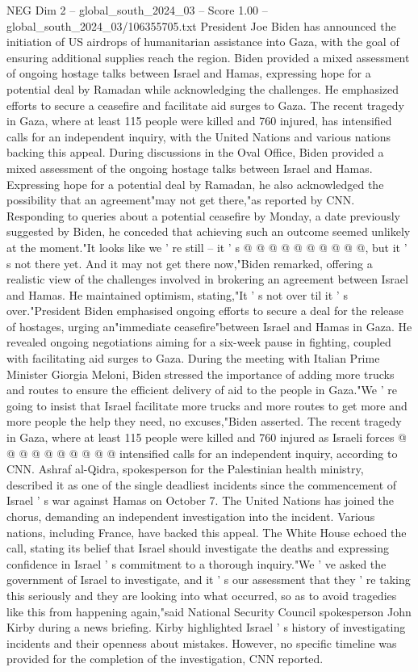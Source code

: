 \begin{textsample}{NEG Dim 2 – global\_south\_2024\_03 – Score 1.00 – global\_south\_2024\_03/106355705.txt}  \label{ex:f2_neg_107}
President Joe Biden has announced the initiation of US airdrops of humanitarian assistance into Gaza, with the goal of ensuring additional supplies reach the region.
Biden provided a mixed assessment of ongoing hostage talks between Israel and Hamas, expressing hope for a potential deal by Ramadan while acknowledging the challenges.
He emphasized efforts to secure a ceasefire and facilitate aid surges to Gaza.
The recent tragedy in Gaza, where at least 115 people were killed and 760 injured, has intensified calls for an independent inquiry, with the United Nations and various nations backing this appeal.
During discussions in the Oval Office, Biden provided a mixed assessment of the ongoing hostage talks between Israel and Hamas.
Expressing hope for a potential deal by Ramadan, he also acknowledged the possibility that an agreement"may not get there,"as reported by CNN.
Responding to queries about a potential ceasefire by Monday, a date previously suggested by Biden, he conceded that achieving such an outcome seemed unlikely at the moment."It looks like we ' re still -- it ' s @ @ @ @ @ @ @ @ @ @, but it ' s not there yet.
And it may not get there now,"Biden remarked, offering a realistic view of the challenges involved in brokering an agreement between Israel and Hamas.
He maintained optimism, stating,"It ' s not over til it ' s over."President Biden emphasised ongoing efforts to secure a deal for the release of hostages, urging an"immediate ceasefire"between Israel and Hamas in Gaza.
He revealed ongoing negotiations aiming for a six-week pause in fighting, coupled with facilitating aid surges to Gaza.
During the meeting with Italian Prime Minister Giorgia Meloni, Biden stressed the importance of adding more trucks and routes to ensure the efficient delivery of aid to the people in Gaza."We ' re going to insist that Israel facilitate more trucks and more routes to get more and more people the help they need, no excuses,"Biden asserted.
The recent tragedy in Gaza, where at least 115 people were killed and 760 injured as Israeli forces @ @ @ @ @ @ @ @ @ @ intensified calls for an independent inquiry, according to CNN.
Ashraf al-Qidra, spokesperson for the Palestinian health ministry, described it as one of the single deadliest incidents since the commencement of Israel ' s war against Hamas on October 7.
The United Nations has joined the chorus, demanding an independent investigation into the incident.
Various nations, including France, have backed this appeal.
The White House echoed the call, stating its belief that Israel should investigate the deaths and expressing confidence in Israel ' s commitment to a thorough inquiry."We ' ve asked the government of Israel to investigate, and it ' s our assessment that they ' re taking this seriously and they are looking into what occurred, so as to avoid tragedies like this from happening again,"said National Security Council spokesperson John Kirby during a news briefing.
Kirby highlighted Israel ' s history of investigating incidents and their openness about mistakes.
However, no specific timeline was provided for the completion of the investigation, CNN reported.

\end{textsample}
